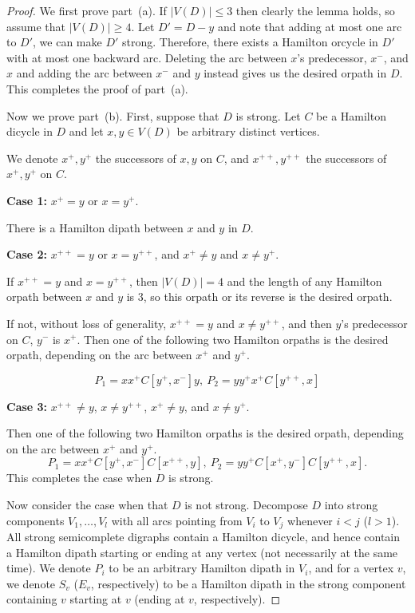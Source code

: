 \documentclass[10pt,a4paper]{amsart}
\begin{document}
\begin{proof}
We first prove part~(a).
If $|V(D)| \le 3$ then clearly the lemma holds, so assume that  $|V(D)| \geq 4$.
Let $D' = D - y$ and note that adding at most one arc to $D'$, we can make $D'$ strong.  Therefore, there exists a Hamilton orcycle in $D'$ with 
at most one backward arc. Deleting the arc between $x$'s predecessor, $x^-$, and $x$ and adding the arc between $x^-$ and $y$ instead gives us the desired orpath in $D$.
This completes the proof of part~(a).

Now we prove part~(b).
First, suppose that $D$ is strong. Let $C$ be a Hamilton dicycle in $D$ and let $x,y \in V(D)$ be arbitrary distinct vertices.

We denote $x^+,y^+$ the successors of $x,y$ on $C$, and $x^{++},y^{++}$ the successors of $x^+,y^+$ on $C$.

\vspace{0.5em}
\textbf{Case 1:} $x^+=y$ or $x=y^+$.

There is a Hamilton dipath between $x$ and $y$ in $D$.

\vspace{0.5em}
\textbf{Case 2:} $x^{++}=y$ or $x=y^{++}$, and $x^+\ne y$ and $x\ne y^+$.

If $x^{++}=y$ and $x=y^{++}$, then $|V(D)|=4$ and the length of any Hamilton orpath between $x$ and $y$ is $3$, so this orpath or its reverse is the desired orpath.

If not, without loss of generality, $x^{++}=y$ and $x\ne y^{++}$, and then  $y$'s predecessor on $C$, $y^-$ is $x^+$. Then one of the following two Hamilton orpaths is the desired orpath, depending on the arc between $x^+$ and $y^+$.

\[
P_1=x x^+ C[y^+, x^-] y,~P_2=y y^+ x^+ C[y^{++}, x]
\]

\vspace{0.5em}
\textbf{Case 3:} $x^{++}\ne y$, $x\ne y^{++}$, $x^+\ne y$, and $x\ne y^+$.

Then one of the following two Hamilton orpaths is the desired orpath, depending on the arc between $x^+$ and $y^+$.
\[
P_1=x x^+ C[y^+, x^-] C[x^{++}, y], ~P_2=y y^+ C[x^+, y^-]C[y^{++}, x]
.\]
This completes the case when $D$ is strong.

Now consider the case when that $D$ is not strong.
Decompose $D$ into strong components $V_1,\dots,V_l$ with all arcs pointing from $V_i$ to $V_j$ whenever $i<j$ ($l>1$). All strong semicomplete digraphs contain a Hamilton dicycle, and hence contain a Hamilton dipath starting or ending at any vertex (not necessarily at the same time). We denote $P_i$ to be an arbitrary Hamilton dipath in $V_i$, and for a vertex $v$, we denote $S_v$ ($E_v$, respectively) to be a Hamilton dipath in the strong component containing $v$ starting at $v$ (ending at $v$, respectively).


\end{proof}
\end{document}
